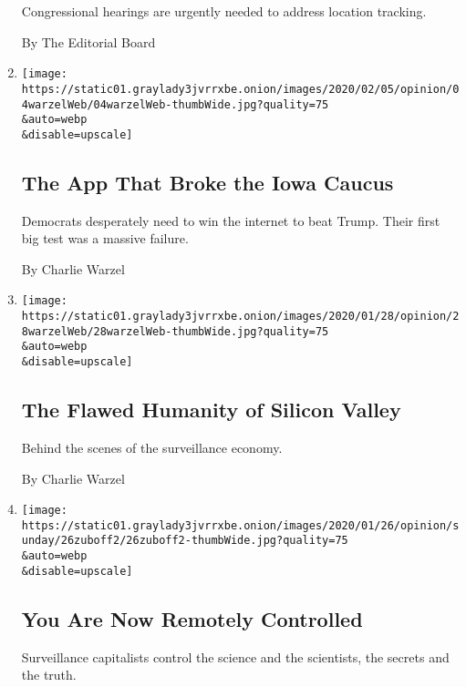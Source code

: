 \begin{enumerate}
  Congressional hearings are urgently needed to address location
  tracking.

  By The Editorial Board
\item
  \href{/2020/02/04/opinion/iowa-caucus-app.html}{}

  \texttt{[image: https://static01.graylady3jvrrxbe.onion/images/2020/02/05/opinion/04warzelWeb/04warzelWeb-thumbWide.jpg?quality=75\\\&auto=webp\\\&disable=upscale]}

  \hypertarget{the-app-that-broke-the-iowa-caucus}{%
  \subsection{The App That Broke the Iowa
  Caucus}\label{the-app-that-broke-the-iowa-caucus}}

  Democrats desperately need to win the internet to beat Trump. Their
  first big test was a massive failure.

  By Charlie Warzel
\item
  \href{/2020/01/28/opinion/silicon-valley-anna-wiener.html}{}

  \texttt{[image: https://static01.graylady3jvrrxbe.onion/images/2020/01/28/opinion/28warzelWeb/28warzelWeb-thumbWide.jpg?quality=75\\\&auto=webp\\\&disable=upscale]}

  \hypertarget{the-flawed-humanity-of-silicon-valley}{%
  \subsection{The Flawed Humanity of Silicon
  Valley}\label{the-flawed-humanity-of-silicon-valley}}

  Behind the scenes of the surveillance economy.

  By Charlie Warzel
\item
  \href{/2020/01/24/opinion/sunday/surveillance-capitalism.html}{}

  \texttt{[image: https://static01.graylady3jvrrxbe.onion/images/2020/01/26/opinion/sunday/26zuboff2/26zuboff2-thumbWide.jpg?quality=75\\\&auto=webp\\\&disable=upscale]}

  \hypertarget{you-are-now-remotely-controlled}{%
  \subsection{You Are Now Remotely
  Controlled}\label{you-are-now-remotely-controlled}}

  Surveillance capitalists control the science and the scientists, the
  secrets and the truth.


\end{enumerate}
